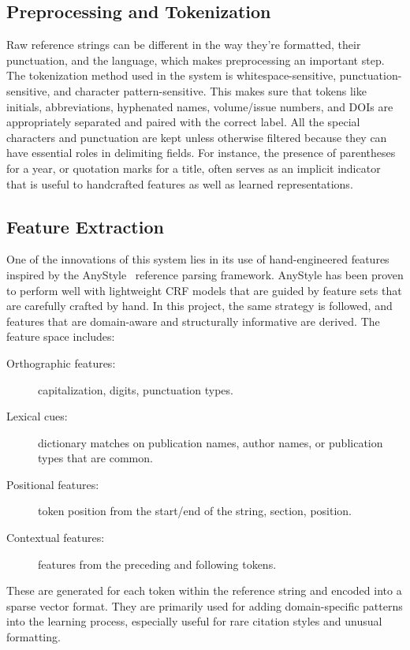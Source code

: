\subsection{Preprocessing and Tokenization}
Raw reference strings can be different in the way they’re formatted, their punctuation, and the language, which makes preprocessing an important step. The tokenization method used in the system is whitespace-sensitive, punctuation-sensitive, and character pattern-sensitive. This makes sure that tokens like initials, abbreviations, hyphenated names, volume/issue numbers, and DOIs are appropriately separated and paired with the correct label.
All the special characters and punctuation are kept unless otherwise filtered because they can have essential roles in delimiting fields. For instance, the presence of parentheses for a year, or quotation marks for a title, often serves as an implicit indicator that is useful to handcrafted features as well as learned representations.

\subsection{Feature Extraction}
One of the innovations of this system lies in its use of hand-engineered features inspired by the AnyStyle~\cite{anystyle} reference parsing framework. AnyStyle has been proven to perform well with lightweight CRF models that are guided by feature sets that are carefully crafted by hand. In this project, the same strategy is followed, and features that are domain-aware and structurally informative are derived.
The feature space includes:
\begin{description}
\item[Orthographic features:] capitalization, digits, punctuation types.
\item[Lexical cues:] dictionary matches on publication names, author names, or publication types that are common.
\item[Positional features:] token position from the start/end of the string, section, position.
\item[Contextual features:] features from the preceding and following tokens.
\end{description}
These are generated for each token within the reference string and encoded into a sparse vector format. They are primarily used for adding domain-specific patterns into the learning process, especially useful for rare citation styles and unusual formatting.

